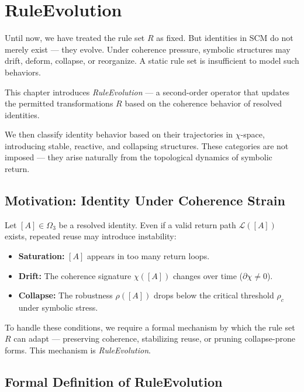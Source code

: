 \chapter{RuleEvolution} \label{chapter_rule-evolution}

Until now, we have treated the rule set $R$ as fixed.  
But identities in SCM do not merely exist — they evolve.  
Under coherence pressure, symbolic structures may drift, deform, collapse, or reorganize.  
A static rule set is insufficient to model such behaviors.

This chapter introduces \textit{RuleEvolution} — a second-order operator that updates the permitted transformations $R$  
based on the coherence behavior of resolved identities.

We then classify identity behavior based on their trajectories in $\chi$-space,  
introducing stable, reactive, and collapsing structures.  
These categories are not imposed — they arise naturally from the topological dynamics of symbolic return.

\section{Motivation: Identity Under Coherence Strain}

Let $[A] \in \Omega_3$ be a resolved identity.  
Even if a valid return path $\mathcal{L}([A])$ exists, repeated reuse may introduce instability:

\begin{itemize}
  \item \textbf{Saturation:} $[A]$ appears in too many return loops.
  \item \textbf{Drift:} The coherence signature $\chi([A])$ changes over time ($\partial \chi \ne 0$).
  \item \textbf{Collapse:} The robustness $\rho([A])$ drops below the critical threshold $\rho_c$ under symbolic stress.
\end{itemize}

To handle these conditions, we require a formal mechanism by which the rule set $R$ can adapt — preserving coherence, stabilizing reuse, or pruning collapse-prone forms.  
This mechanism is \textit{RuleEvolution}.

\section{Formal Definition of RuleEvolution} \label{formal-definition-of-ruleevolution}


